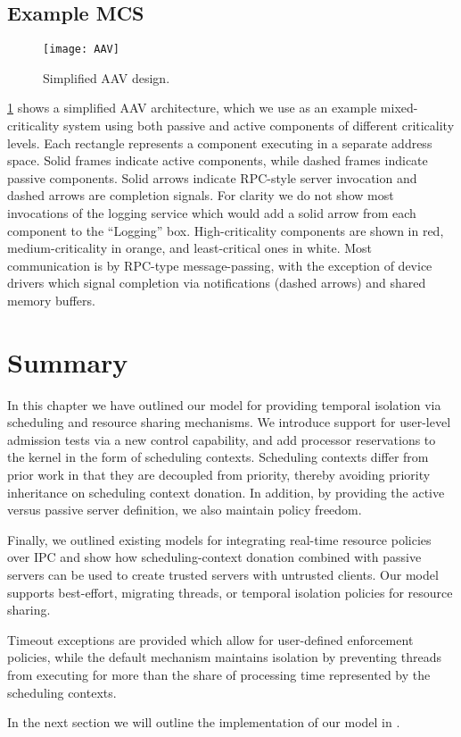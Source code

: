 \subsection{Example MCS}

\begin{figure}[b]                                                                      
  \centering                                                                          
  \texttt{[image: AAV]}                                           
  \caption{Simplified AAV design.}                  
  \label{f:aav}                                                                       
\end{figure}                                                                          

\cref{f:aav} shows a simplified AAV architecture, which we use as an example
mixed-criticality system using both passive and active components of different criticality levels.
Each rectangle represents a component executing in a separate address space. 
Solid frames indicate active components, while dashed frames indicate passive components.   Solid
arrows indicate RPC-style server invocation and dashed    
    arrows are completion signals. For clarity we do not show most                    
    invocations of the logging service which would add a solid arrow                  
    from each component to the ``Logging'' box. High-criticality                         
    components are shown in red, medium-criticality in orange, and least-critical ones in white.     
Most communication is by RPC-type message-passing, with the exception of device drivers which signal
\IO completion via notifications (dashed arrows) and shared memory buffers.

\section{Summary}

In this chapter we have outlined our model for providing temporal isolation via scheduling and
resource sharing mechanisms. We introduce support for user-level
admission tests via a new control capability, and add processor reservations to the kernel in the form of scheduling contexts.  
Scheduling contexts differ from prior work in that they are decoupled from priority, thereby
avoiding priority inheritance on scheduling context donation. In addition, by providing the active
versus passive server definition, we also maintain policy freedom.

Finally, we outlined existing models for integrating real-time resource policies over \gls{IPC} and
show how scheduling-context donation combined with passive servers can be used to create trusted
servers with untrusted clients. 
Our model supports best-effort, migrating threads, or temporal isolation policies for resource sharing.

Timeout exceptions are provided which allow for user-defined enforcement policies, while the default
mechanism maintains isolation by preventing threads from executing for more than the share of processing
time represented by the scheduling contexts.

In the next section we will outline the implementation of our model in \selfour. 
